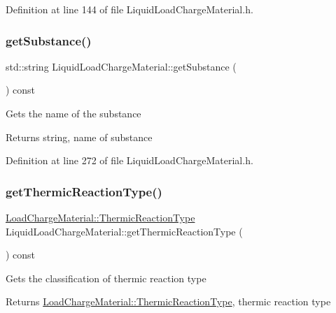 Definition at line 144 of file Liquid\+Load\+Charge\+Material.\+h.

\mbox{\label{class_liquid_load_charge_material_a8f925c04c15ed889ba3fd7c4b628dbff}} 
\subsubsection{\texorpdfstring{get\+Substance()}{getSubstance()}}
{\footnotesize\ttfamily std\+::string Liquid\+Load\+Charge\+Material\+::get\+Substance (\begin{DoxyParamCaption}{ }\end{DoxyParamCaption}) const\hspace{0.3cm}{\ttfamily [inline]}}

Gets the name of the substance \begin{DoxyReturn}{Returns}
string, name of substance 
\end{DoxyReturn}


Definition at line 272 of file Liquid\+Load\+Charge\+Material.\+h.

\mbox{\label{class_liquid_load_charge_material_a181337f5e5cf6a47b82dd56897b49c29}} 
\subsubsection{\texorpdfstring{get\+Thermic\+Reaction\+Type()}{getThermicReactionType()}}
{\footnotesize\ttfamily \hyperlink{class_load_charge_material_a51d4263e865a5d86236622dd3fe23fd1}{Load\+Charge\+Material\+::\+Thermic\+Reaction\+Type} Liquid\+Load\+Charge\+Material\+::get\+Thermic\+Reaction\+Type (\begin{DoxyParamCaption}{ }\end{DoxyParamCaption}) const\hspace{0.3cm}{\ttfamily [inline]}}

Gets the classification of thermic reaction type \begin{DoxyReturn}{Returns}
\hyperlink{class_load_charge_material_a51d4263e865a5d86236622dd3fe23fd1}{Load\+Charge\+Material\+::\+Thermic\+Reaction\+Type}, thermic reaction type 
\end{DoxyReturn}


